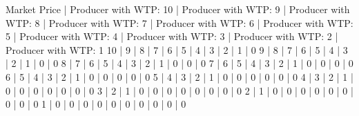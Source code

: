\documentclass[letterpaper,10pt,english]{jupyterBook}
\begin{document}
\begin{sphinxVerbatim}[commandchars=\\\{\}]
Market Price | Producer with WTP: 10 | Producer with WTP: 9 | Producer with WTP: 8 | Producer with WTP: 7 | Producer with WTP: 6 | Producer with WTP: 5 | Producer with WTP: 4 | Producer with WTP: 3 | Producer with WTP: 2 | Producer with WTP: 1
10           | 9                     | 8                    | 7                    | 6                    | 5                    | 4                    | 3                    | 2                    | 1                    | 0
9            | 8                     | 7                    | 6                    | 5                    | 4                    | 3                    | 2                    | 1                    | 0                    | 0
8            | 7                     | 6                    | 5                    | 4                    | 3                    | 2                    | 1                    | 0                    | 0                    | 0
7            | 6                     | 5                    | 4                    | 3                    | 2                    | 1                    | 0                    | 0                    | 0                    | 0
6            | 5                     | 4                    | 3                    | 2                    | 1                    | 0                    | 0                    | 0                    | 0                    | 0
5            | 4                     | 3                    | 2                    | 1                    | 0                    | 0                    | 0                    | 0                    | 0                    | 0
4            | 3                     | 2                    | 1                    | 0                    | 0                    | 0                    | 0                    | 0                    | 0                    | 0
3            | 2                     | 1                    | 0                    | 0                    | 0                    | 0                    | 0                    | 0                    | 0                    | 0
2            | 1                     | 0                    | 0                    | 0                    | 0                    | 0                    | 0                    | 0                    | 0                    | 0
1            | 0                     | 0                    | 0                    | 0                    | 0                    | 0                    | 0                    | 0                    | 0                    | 0
\end{sphinxVerbatim}
\end{document}
